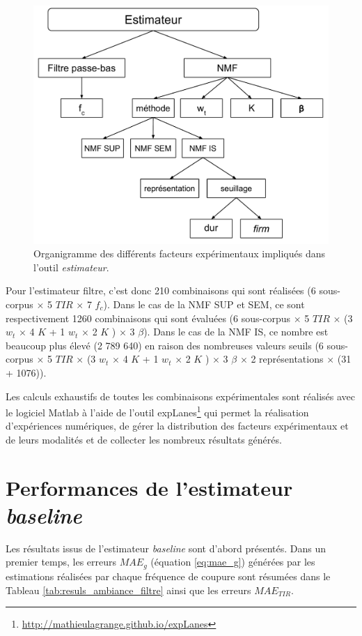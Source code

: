 \begin{figure}[h]
\centering
\includegraphics[width=0.8\linewidth]{./figures/NMF/facteurs_exp.pdf}
\caption{Organigramme des différents facteurs expérimentaux impliqués dans l'outil \textit{estimateur}.}
\label{fig:organigramme}
\end{figure}

Pour l'estimateur filtre, c'est donc 210 combinaisons qui sont réalisées (6 sous-corpus $\times$ 5 $TIR$ $\times$ 7 $f_c$). Dans le cas de la NMF SUP et SEM, ce sont respectivement 1260 combinaisons qui sont évaluées (6 sous-corpus $\times$ 5 $TIR$ $\times$ (3 $w_t$ $\times$ 4 $K$ + 1 $w_t$ $\times$ 2 $K$ ) $\times$ 3 $\beta$). Dans le cas de la NMF IS, ce nombre est beaucoup plus élevé (2 789 640) en raison des nombreuses valeurs seuils (6 sous-corpus $\times$ 5 $TIR$ $\times$ (3 $w_t$ $\times$ 4 $K$ + 1 $w_t$ $\times$ 2 $K$ ) $\times$ 3 $\beta$ $\times$ 2 représentations $\times$ (31 + 1076)).

Les calculs exhaustifs de toutes les combinaisons expérimentales sont réalisés avec le logiciel Matlab à l'aide de l'outil expLanes\footnote{\url{http://mathieulagrange.github.io/expLanes}} qui permet la réalisation d'expériences numériques, de gérer la distribution des facteurs expérimentaux et de leurs modalités et de collecter les nombreux résultats générés. 

\section{Performances de l'estimateur \textit{baseline}}

Les résultats issus de l'estimateur \textit{baseline} sont d'abord présentés. Dans un premier temps, les erreurs $MAE_g$ (équation \ref{eq:mae_g}) générées par les estimations réalisées par chaque fréquence de coupure sont résumées dans le Tableau \ref{tab:resuls_ambiance_filtre} ainsi que les erreurs $MAE_{TIR}$.

